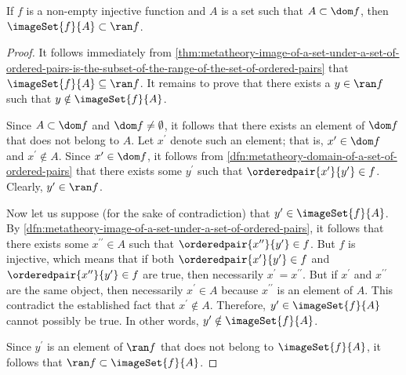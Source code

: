 \begin{thm}
     \label{thm:metatheory-the-image-of-a-proper-subset-under-an-injective-function-is-a-proper-subset-of-the-range}
    If \( f \) is a non-empty injective function and \( A \) is a set such that \( A \subset \dom f \), then \( \imageSet{f}{A} \subset \ran f \).
\end{thm}

\begin{proof}
    It follows immediately from \cref{thm:metatheory-image-of-a-set-under-a-set-of-ordered-pairs-is-the-subset-of-the-range-of-the-set-of-ordered-pairs} that \( \imageSet{f}{A} \subseteq \ran f \).
    It remains to prove that there exists a \( y \in \ran f \) such that \( y \notin \imageSet{f}{A} \).

    \vspace{0.3cm}
    \noindent
    Since \( A \subset \dom f \) and \( \dom f \neq \emptyset \), it follows that there exists an element of \( \dom f \) that does not belong to \( A \).
    Let \( x^{\prime} \) denote such an element; that is, \( x^{\prime} \in \dom f \) and \( x^{\prime} \notin A \).
    Since \( x^{\prime} \in \dom f \), it follows from \cref{dfn:metatheory-domain-of-a-set-of-ordered-pairs} that
    there exists some \( y^{\prime} \) such that \( \orderedpair{x^{\prime}}{y^{\prime}} \in f \).
    Clearly, \( y^{\prime} \in \ran f \).

    \vspace{0.3cm}
    \noindent
    Now let us suppose (for the sake of contradiction) that \( y^{\prime} \in \imageSet{f}{A} \).
    By \cref{dfn:metatheory-image-of-a-set-under-a-set-of-ordered-pairs}, it follows that there exists some \( x^{\prime\prime} \in A \) such that
    \( \orderedpair{x^{\prime\prime}}{y^{\prime}} \in f \).
    But \( f \) is injective, which means that if both \( \orderedpair{x^{\prime}}{y^{\prime}} \in f \) and \( \orderedpair{x^{\prime\prime}}{y^{\prime}} \in f \)
    are true, then necessarily \( x^{\prime} = x^{\prime\prime} \).
    But if \( x^{\prime} \) and \( x^{\prime\prime} \) are the same object, then necessarily \( x^{\prime} \in A \) because \( x^{\prime\prime} \) is an element of \( A \).
    This contradict the established fact that \( x^{\prime} \notin A \).
    Therefore, \( y^{\prime} \in \imageSet{f}{A} \) cannot possibly be true.
    In other words, \( y^{\prime} \notin \imageSet{f}{A} \).

    \vspace{0.3cm}
    \noindent
    Since \( y^{\prime} \) is an element of \( \ran f \) that does not belong to \( \imageSet{f}{A} \), it follows that \( \ran f \subset \imageSet{f}{A} \).
\end{proof}

